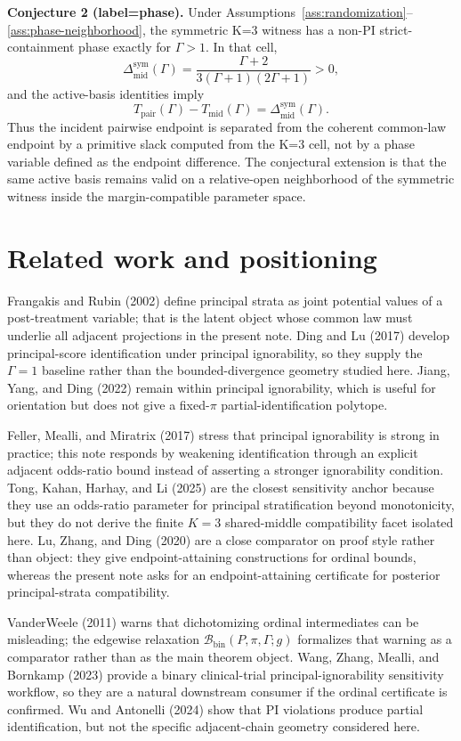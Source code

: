 \documentclass[11pt]{article}
\theoremstyle{definition}
\theoremstyle{plain}
\theoremstyle{remark}
\begin{document}
\textbf{Conjecture 2 (label=phase).} Under Assumptions~\ref{ass:randomization}--\ref{ass:phase-neighborhood}, the symmetric K=3 witness has a non-PI strict-containment phase exactly for \(\Gamma>1\).  In that cell,
\[
  \Delta_{\mathrm{mid}}^{\mathrm{sym}}(\Gamma)
  =\frac{\Gamma+2}{3(\Gamma+1)(2\Gamma+1)}>0,
\]
and the active-basis identities imply
\[
  T_{\mathrm{pair}}(\Gamma)-T_{\mathrm{mid}}(\Gamma)
  =
  \Delta_{\mathrm{mid}}^{\mathrm{sym}}(\Gamma).
\]
Thus the incident pairwise endpoint is separated from the coherent common-law endpoint by a primitive slack computed from the K=3 cell, not by a phase variable defined as the endpoint difference.  The conjectural extension is that the same active basis remains valid on a relative-open neighborhood of the symmetric witness inside the margin-compatible parameter space.

\section{Related work and positioning}
Frangakis and Rubin (2002) define principal strata as joint potential values of a post-treatment variable; that is the latent object whose common law must underlie all adjacent projections in the present note.  Ding and Lu (2017) develop principal-score identification under principal ignorability, so they supply the \(\Gamma=1\) baseline rather than the bounded-divergence geometry studied here.  Jiang, Yang, and Ding (2022) remain within principal ignorability, which is useful for orientation but does not give a fixed-\(\pi\) partial-identification polytope.

Feller, Mealli, and Miratrix (2017) stress that principal ignorability is strong in practice; this note responds by weakening identification through an explicit adjacent odds-ratio bound instead of asserting a stronger ignorability condition.  Tong, Kahan, Harhay, and Li (2025) are the closest sensitivity anchor because they use an odds-ratio parameter for principal stratification beyond monotonicity, but they do not derive the finite \(K=3\) shared-middle compatibility facet isolated here.  Lu, Zhang, and Ding (2020) are a close comparator on proof style rather than object: they give endpoint-attaining constructions for ordinal bounds, whereas the present note asks for an endpoint-attaining certificate for posterior principal-strata compatibility.

VanderWeele (2011) warns that dichotomizing ordinal intermediates can be misleading; the edgewise relaxation \(\mathcal B_{\mathrm{bin}}(P,\pi,\Gamma;g)\) formalizes that warning as a comparator rather than as the main theorem object.  Wang, Zhang, Mealli, and Bornkamp (2023) provide a binary clinical-trial principal-ignorability sensitivity workflow, so they are a natural downstream consumer if the ordinal certificate is confirmed.  Wu and Antonelli (2024) show that PI violations produce partial identification, but not the specific adjacent-chain geometry considered here.
\end{document}
